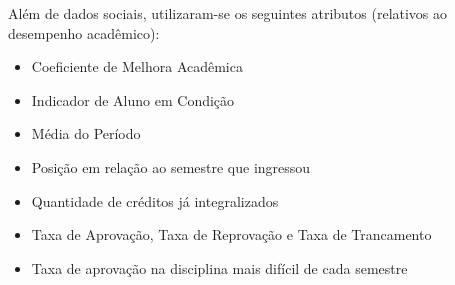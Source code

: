 Além de dados sociais, utilizaram-se os seguintes atributos (relativos ao desempenho
acadêmico): 
\begin{itemize}
    \item Coeficiente de Melhora Acadêmica
    \item Indicador de Aluno em Condição
    \item Média do Período
    \item Posição em relação ao semestre que ingressou
    \item Quantidade de créditos já integralizados
    \item Taxa de Aprovação, Taxa de Reprovação e Taxa de Trancamento
    \item Taxa de aprovação na disciplina mais difícil de cada semestre
\end{itemize}


